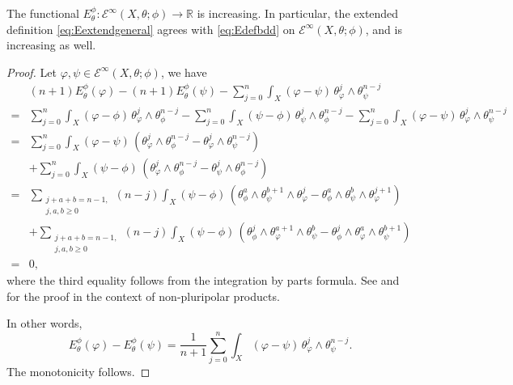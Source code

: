 \begin{lemma}\label{lma:EmonoEinfty}
    The functional $E_{\theta}^{\phi}\colon \mathcal{E}^{\infty}(X,\theta;\phi)\rightarrow \mathbb{R}$ is increasing. In particular, the extended definition \eqref{eq:Eextendgeneral} agrees with \eqref{eq:Edefbdd} on $\mathcal{E}^{\infty}(X,\theta;\phi)$, and is increasing as well.
\end{lemma}
\begin{proof}
    Let $\varphi,\psi\in \mathcal{E}^{\infty}(X,\theta;\phi)$, we have
    \[
    \begin{aligned}
    &(n+1)E^{\phi}_{\theta}(\varphi)-(n+1)E^{\phi}_{\theta}(\psi)-\sum_{j=0}^n \int_X (\varphi-\psi)\,\theta_{\varphi}^j\wedge \theta_{\psi}^{n-j} \\
    =& \sum_{j=0}^n \int_X (\varphi-\phi)\, \theta_{\varphi}^j\wedge \theta_{\phi}^{n-j}-\sum_{j=0}^n \int_X (\psi-\phi)\, \theta_{\psi}^j\wedge \theta_{\phi}^{n-j}-\sum_{j=0}^n \int_X (\varphi-\psi)\,\theta_{\varphi}^j\wedge \theta_{\psi}^{n-j}\\
    =& \sum_{j=0}^n \int_X (\varphi-\psi)\,\left( \theta_{\varphi}^j\wedge \theta_{\phi}^{n-j}-\theta_{\varphi}^j\wedge \theta_{\psi}^{n-j} \right)\\
    &+\sum_{j=0}^n \int_X (\psi-\phi)\,\left( \theta_{\varphi}^j\wedge \theta_{\phi}^{n-j}-\theta_{\psi}^j\wedge \theta_{\phi}^{n-j} \right)\\
    =& \sum_{\substack{j+a+b=n-1,\\ j,a,b\geq 0}} (n-j)\int_X (\psi-\phi)\,\left( \theta_{\phi}^a\wedge \theta_{\psi}^{b+1}\wedge \theta_{\varphi}^j- \theta_{\phi}^a\wedge \theta_{\psi}^{b}\wedge \theta_{\varphi}^{j+1}\right)\\
    &+\sum_{\substack{j+a+b=n-1,\\ j,a,b\geq 0}} (n-j)\int_X (\psi-\phi)\,\left( \theta_{\phi}^j\wedge \theta_{\varphi}^{a+1}\wedge \theta_{\psi}^b- \theta_{\phi}^j\wedge \theta_{\varphi}^{a}\wedge \theta_{\psi}^{b+1}\right)\\
    =&0,
    \end{aligned}
    \]
    where the third equality follows from the integration by parts formula. See \cite{Xia19b, Lu21} and \cite[Theorem~17.1.3]{FPT} for the proof in the context of non-pluripolar products.

    In other words,
    \begin{equation}\label{eq:int_by_part_E_temp1}
    E^{\phi}_{\theta}(\varphi)-E^{\phi}_{\theta}(\psi)=\frac{1}{n+1}\sum_{j=0}^n \int_X(\varphi-\psi)\,\theta_{\varphi}^j\wedge \theta_{\psi}^{n-j}.
    \end{equation}
    The monotonicity follows.
\end{proof}


